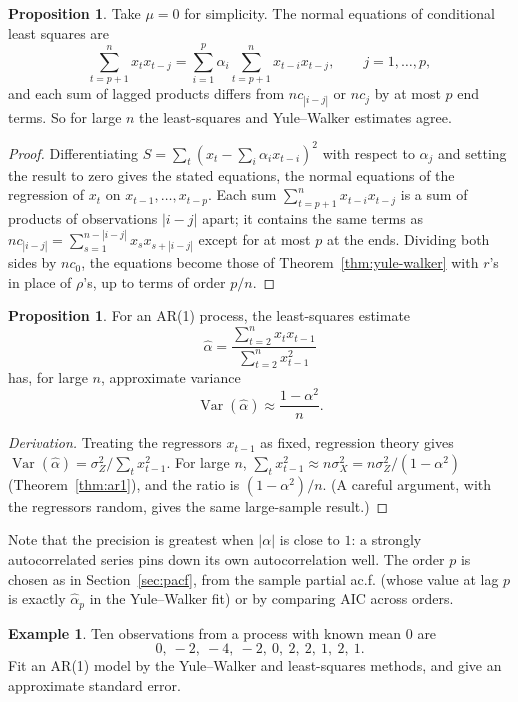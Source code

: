 \documentclass[11pt,a4paper]{article}
\theoremstyle{definition}
\newtheorem{exa}[thm]{Example}
\newtheorem{prop}[thm]{Proposition}
\DeclareMathOperator{\Var}{Var}
\begin{document}
\begin{prop}\label{prop:ls-yw}
Take $\mu = 0$ for simplicity. The normal equations of conditional least squares are
\[
\sum_{t=p+1}^nx_tx_{t-j} = \sum_{i=1}^p\hat\alpha_i\sum_{t=p+1}^nx_{t-i}x_{t-j} , \qquad j = 1, \dots, p ,
\]
and each sum of lagged products differs from $nc_{|i-j|}$ or $nc_j$ by at most $p$ end terms. So for large $n$ the least-squares and
Yule--Walker estimates agree.
\end{prop}

\begin{proof}
Differentiating $S = \sum_t(x_t - \sum_i\alpha_ix_{t-i})^2$ with respect to $\alpha_j$ and setting the result to zero gives the stated equations, the
normal equations of the regression of $x_t$ on $x_{t-1}, \dots, x_{t-p}$. Each sum $\sum_{t=p+1}^nx_{t-i}x_{t-j}$ is a sum of products of observations $|i - j|$
apart; it contains the same terms as $nc_{|i-j|} = \sum_{s=1}^{n-|i-j|}x_sx_{s+|i-j|}$ except for at most $p$ at the ends. Dividing both sides by $nc_0$, the
equations become those of Theorem~\ref{thm:yule-walker} with $r$'s in place of $\rho$'s, up to terms of order $p/n$.
\end{proof}

\begin{prop}\label{prop:ar1-se}
For an AR(1) process, the least-squares estimate
\[
\hat\alpha = \frac{\sum_{t=2}^nx_tx_{t-1}}{\sum_{t=2}^nx_{t-1}^2}
\]
has, for large $n$, approximate variance
\[
\Var(\hat\alpha) \approx \frac{1 - \alpha^2}{n} .
\]
\end{prop}

\begin{proof}[Derivation]
Treating the regressors $x_{t-1}$ as fixed, regression theory gives $\Var(\hat\alpha) = \sigma_Z^2/\sum_tx_{t-1}^2$. For large $n$, $\sum_tx_{t-1}^2 \approx n\sigma_X^2 = n\sigma_Z^2/(1 - \alpha^2)$
(Theorem~\ref{thm:ar1}), and the ratio is $(1 - \alpha^2)/n$. (A careful argument, with the regressors random, gives the same
large-sample result.)
\end{proof}

Note that the precision is greatest when $|\alpha|$ is close to $1$: a strongly autocorrelated series pins down its own
autocorrelation well. The order $p$ is chosen as in Section~\ref{sec:pacf}, from the sample partial ac.f. (whose value at lag $p$ is
exactly $\hat\alpha_p$ in the Yule--Walker fit) or by comparing AIC across orders.

\begin{exa}\label{exa:fit-ar1}
Ten observations from a process with known mean $0$ are
\[
0, \ -2, \ -4, \ -2, \ 0, \ 2, \ 2, \ 1, \ 2, \ 1 .
\]
Fit an AR(1) model by the Yule--Walker and least-squares methods, and give an approximate standard error.
\end{exa}
\end{document}
